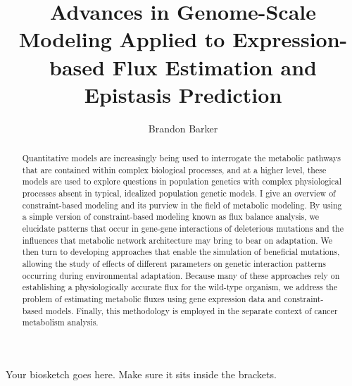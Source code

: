 \documentclass[phd,tocprelim]{cornell}
\title {Advances in Genome-Scale Modeling Applied to Expression-based
Flux Estimation and Epistasis Prediction}
\author {Brandon Barker}
\newcommand*{\commonDir}{../common/}   %
\begin{document}



\maketitle
\makecopyright

\begin{abstract}

Quantitative models are increasingly being used to interrogate the
metabolic pathways that are contained within complex biological
processes, and at a higher level, these models are used to explore
questions in population genetics with complex physiological processes
absent in typical, idealized population genetic models.  I give an
overview of constraint-based modeling and its purview in the field of
metabolic modeling. By using a simple version of constraint-based
modeling known as flux balance analysis, we elucidate patterns that
occur in gene-gene interactions of deleterious mutations and the
influences that metabolic network architecture may bring to bear on
adaptation. We then turn to developing approaches that enable the
simulation of beneficial mutations, allowing the study of effects of
different parameters on genetic interaction patterns occurring during
environmental adaptation. Because many of these approaches rely on
establishing a physiologically accurate flux for the wild-type
organism, we address the problem of estimating metabolic fluxes using
gene expression data and constraint-based models. Finally, this
methodology is employed in the separate context of cancer metabolism
analysis.
\end{abstract}

\begin{biosketch}
Your biosketch goes here. Make sure it sits inside
the brackets.
\end{biosketch}
\end{document}
